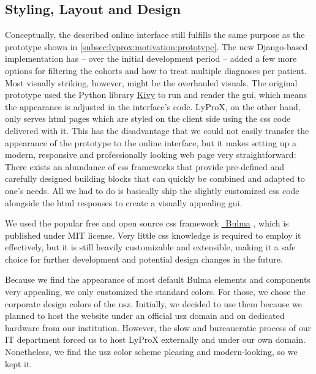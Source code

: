 \documentclass[\relativeRoot/main.tex]{subfiles}
\begin{document}
\subsection*{Styling, Layout and Design}
\label{subsec:lyprox:implementation:design}

Conceptually, the described online interface still fulfills the same purpose as the prototype shown in \cref{subsec:lyprox:motivation:prototype}. The new Django-based implementation has -- over the initial development period -- added a few more options for filtering the cohorts and how to treat multiple diagnoses per patient. Most visually striking, however, might be the overhauled visuals. The original prototype used the Python library \href{https://kivy.org}{Kivy} to run and render the \gls{gui}, which means the appearance is adjusted in the interface's code. LyProX, on the other hand, only serves \acrshort{html} pages which are styled on the client side using the \gls{css} code delivered with it. This has the disadvantage that we could not easily transfer the appearance of the prototype to the online interface, but it makes setting up a modern, responsive and professionally looking web page very straightforward: There exists an abundance of \gls{css} frameworks that provide pre-defined and carefully designed building blocks that can quickly be combined and adapted to one's needs. All we had to do is basically ship the slightly customized \gls{css} code alongside the \acrshort{html} responses to create a visually appealing \gls{gui}.

We used the popular free and open source \gls{css} framework \href{https://bulma.io}{~Bulma} \cite{thomas_bulma_2021}, which is published under MIT license. Very little \gls{css} knowledge is required to employ it effectively, but it is still heavily customizable and extensible, making it a safe choice for further development and potential design changes in the future.

Because we find the appearance of most default Bulma elements and components very appealing, we only customized the standard colors. For those, we chose the corporate design colors of the \gls{usz}. Initially, we decided to use them because we planned to host the website under an official \gls{usz} domain and on dedicated hardware from our institution. However, the slow and bureaucratic process of our IT department forced us to host LyProX externally and under our own domain. Nonetheless, we find the \gls{usz} color scheme pleasing and modern-looking, so we kept it.
\end{document}
